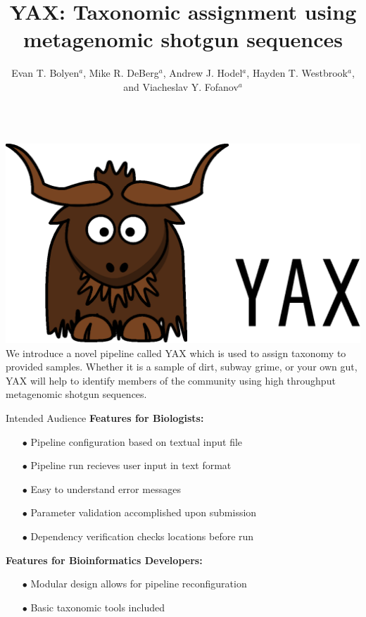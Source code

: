 \documentclass[final,t]{beamer}
\title{\huge YAX: Taxonomic assignment using metagenomic shotgun sequences}
\author{Evan T. Bolyen$^{a}$, Mike R. DeBerg$^{a}$, Andrew J. Hodel$^{a}$, Hayden T. Westbrook$^{a}$, and Viacheslav Y. Fofanov$^{a}$}
\institute{$^{a}$School of Computing, Informatics, and Cybersystems - Northern Arizona Univ.}
\begin{document}
\begin{frame}{}
  \begin{columns}[t]
    \begin{column}{.3\linewidth}
        \begin{alertblock}{\includegraphics[width=.9\linewidth]{assets/yak}\newline\newline}
            We introduce a novel pipeline called YAX which is used to assign taxonomy to provided samples. Whether it is a sample of dirt, subway grime, or your own gut, YAX will help to identify members of the community using high throughput metagenomic shotgun sequences.
          \newline
        \end{alertblock}
        \begin{block}{Intended Audience}
            \textbf{Features for Biologists:}
            \begin{itemize}
                \item[$\bullet$]Pipeline configuration based on textual input file
                \item[$\bullet$]Pipeline run recieves user input in text format
                \item[$\bullet$]Easy to understand error messages
                \item[$\bullet$]Parameter validation accomplished upon submission
                \item[$\bullet$]Dependency verification checks locations before run
            \end{itemize}
            \vspace{1cm}
            \textbf{Features for Bioinformatics Developers:}
            \begin{itemize}
                \item[$\bullet$]Modular design allows for pipeline reconfiguration
                \item[$\bullet$]Basic taxonomic tools included
            \end{itemize}
        \end{block}


\end{column}
\end{columns}
\end{frame}
\end{document}
